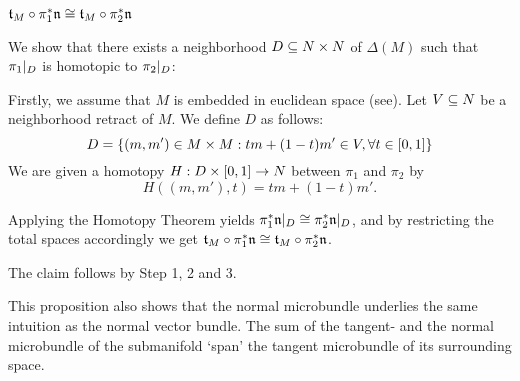 \begin{myproof}
\begin{steps}
        \item $\mathfrak{t}_M \circ \pi_1^*\mathfrak{n} \cong \mathfrak{t}_M \circ \pi_2^*\mathfrak{n}$
        
        We show that there exists a neighborhood $D \subseteq{} N \times N$ of $\Delta(M)$ such that
        $\pi_1\vert_{D}$ is homotopic to $\pi_2\vert_{D}$:

        Firstly, we assume that $M$ is embedded in euclidean space (see\cite[p.60]{dimension}).
        Let $V \subseteq{} N$ be a neighborhood retract of $M$.
        We define $D$ as follows:
        \[ D = \{(m, m') \in M \times M: tm + (1 - t)m' \in V, \forall t \in [0, 1]\} \]
        We are given a homotopy $H: D \times{} [0, 1] \to N$ between $\pi_1$ and $\pi_2$ by
        \[ H((m, m'), t) = tm + (1 - t)m'. \]

        Applying the Homotopy Theorem yields $\pi_1^*\mathfrak{n}\vert_{D} \cong \pi_2^*\mathfrak{n}\vert_{D}$, and
        by restricting the total spaces accordingly we get
        $\mathfrak{t}_M \circ \pi_1^*\mathfrak{n} \cong \mathfrak{t}_M \circ \pi_2^*\mathfrak{n}$.
    \end{steps}
    The claim follows by Step 1, 2 and 3.
\end{myproof}

\begin{myparagraph}
    This proposition also shows that the normal microbundle
    underlies the same intuition as the normal vector bundle. 
    The sum of the tangent- and the normal microbundle of the submanifold
    `span' the tangent microbundle of its surrounding space.
\end{myparagraph}